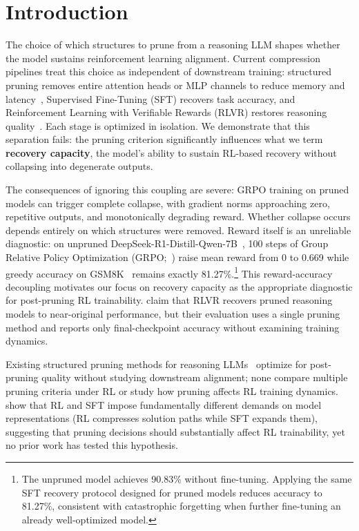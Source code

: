 \section{Introduction}
\label{sec:intro}

The choice of which structures to prune from a reasoning LLM shapes whether the model sustains reinforcement learning alignment.
Current compression pipelines treat this choice as independent of downstream training: structured pruning removes entire attention heads or MLP channels to reduce memory and latency~\citep{llmpruner2023,graspprune2026}, Supervised Fine-Tuning (SFT) recovers task accuracy, and Reinforcement Learning with Verifiable Rewards (RLVR) restores reasoning quality~\citep{deepseek2025r1,shao2024grpo}.
Each stage is optimized in isolation.
We demonstrate that this separation fails: the pruning criterion significantly influences what we term \textbf{recovery capacity}, the model's ability to sustain RL-based recovery without collapsing into degenerate outputs.

The consequences of ignoring this coupling are severe: GRPO training on pruned models can trigger complete collapse, with gradient norms approaching zero, repetitive outputs, and monotonically degrading reward.
Whether collapse occurs depends entirely on which structures were removed.
Reward itself is an unreliable diagnostic: on unpruned DeepSeek-R1-Distill-Qwen-7B~\citep{deepseek2025r1}, 100 steps of Group Relative Policy Optimization (GRPO;~\citealp{shao2024grpo}) raise mean reward from 0 to 0.669 while greedy accuracy on GSM8K~\citep{cobbe2021gsm8k} remains exactly 81.27\%.\footnote{The unpruned model achieves 90.83\% without fine-tuning. Applying the same SFT recovery protocol designed for pruned models reduces accuracy to 81.27\%, consistent with catastrophic forgetting when further fine-tuning an already well-optimized model.}
This reward-accuracy decoupling motivates our focus on recovery capacity as the appropriate diagnostic for post-pruning RL trainability.
\citet{selfhealing2025} claim that RLVR recovers pruned reasoning models to near-original performance, but their evaluation uses a single pruning method and reports only final-checkpoint accuracy without examining training dynamics.

Existing structured pruning methods for reasoning LLMs~\citep{graspprune2026,resp2025,llmpruner2023,bonsai2025,paser2025,pat2025} optimize for post-pruning quality without studying downstream alignment; none compare multiple pruning criteria under RL or study how pruning affects RL training dynamics.
\citet{rlsqueezes2026} show that RL and SFT impose fundamentally different demands on model representations (RL compresses solution paths while SFT expands them), suggesting that pruning decisions should substantially affect RL trainability, yet no prior work has tested this hypothesis.

